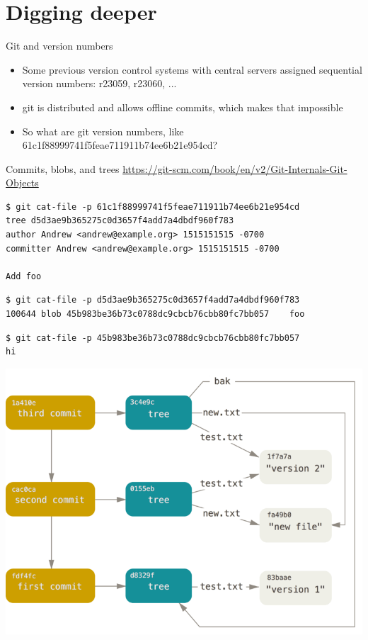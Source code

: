 \documentclass[xcolor=svgnames,17pt]{beamer}
\newcommand*{\sizefont}[1]{%
    \ifcase#1\relax
    \or \tiny
    \or \scriptsize
    \or \footnotesize
    \or \small
    \or \normalsize
    \or \large
    \or \Large
    \or \LARGE
    \or \huge
    \or \Huge
    \fi}
\begin{document}
\section{Digging deeper}

\begin{frame}
\tableofcontents[currentsection]
\end{frame}

\begin{frame}{Git and version numbers}
\begin{itemize}
\item Some previous version control systems with central servers assigned
sequential version numbers: r23059, r23060, ...
\pause
\item git is distributed and allows offline commits, which makes that
impossible
\pause
\item So what are git version numbers, like
61c1f88999741f5feae711911b74ee6b21e954cd?
\end{itemize}
\end{frame}

\begin{frame}[fragile]{Commits, blobs, and trees}
\sizefont{2}
\href{https://git-scm.com/book/en/v2/Git-Internals-Git-Objects}{https://git-scm.com/book/en/v2/Git-Internals-Git-Objects}

\begin{verbatim}
$ git cat-file -p 61c1f88999741f5feae711911b74ee6b21e954cd
tree d5d3ae9b365275c0d3657f4add7a4dbdf960f783
author Andrew <andrew@example.org> 1515151515 -0700
committer Andrew <andrew@example.org> 1515151515 -0700

Add foo
\end{verbatim}
\pause
\begin{verbatim}
$ git cat-file -p d5d3ae9b365275c0d3657f4add7a4dbdf960f783
100644 blob 45b983be36b73c0788dc9cbcb76cbb80fc7bb057	foo
\end{verbatim}
\pause
\begin{verbatim}
$ git cat-file -p 45b983be36b73c0788dc9cbcb76cbb80fc7bb057
hi
\end{verbatim}
\end{frame}

\begin{frame}
\includegraphics[width=0.9\paperwidth,center]{data-model-3.png}
\end{frame}
\end{document}
